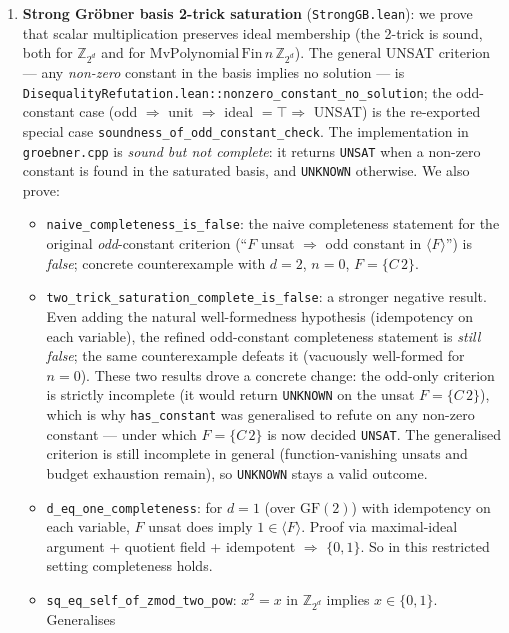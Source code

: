 \documentclass[runningheads]{llncs}
\begin{document}
\begin{enumerate}
\item \textbf{Strong Gr\"obner basis 2-trick saturation}
  (\texttt{StrongGB.lean}): we prove that scalar multiplication
  preserves ideal membership (the 2-trick is sound, both for
  $\mathbb{Z}_{2^d}$ and for $\mathrm{MvPolynomial}\, \mathrm{Fin}\, n\, \mathbb{Z}_{2^d}$).
  The general UNSAT criterion --- any \emph{non-zero} constant in
  the basis implies no solution --- is
  \texttt{DisequalityRefutation.lean::nonzero\_constant\_no\_solution};
  the odd-constant case (odd $\Rightarrow$ unit $\Rightarrow$
  ideal $= \top \Rightarrow$ UNSAT) is the re-exported special
  case \texttt{soundness\_of\_odd\_constant\_check}. The
  implementation in \texttt{groebner.cpp} is \emph{sound but not
  complete}: it returns \texttt{UNSAT} when a non-zero constant
  is found in the saturated basis, and \texttt{UNKNOWN}
  otherwise. We also prove:
  \begin{itemize}
  \item \texttt{naive\_completeness\_is\_false}: the naive
    completeness statement for the original \emph{odd}-constant
    criterion (``$F$ unsat $\Rightarrow$ odd constant
    in $\langle F\rangle$'') is \emph{false}; concrete
    counterexample with $d=2$, $n=0$, $F=\{C\,2\}$.
  \item \texttt{two\_trick\_saturation\_complete\_is\_false}:
    a stronger negative result. Even adding the natural
    well-formedness hypothesis (idempotency on each variable),
    the refined odd-constant completeness statement is
    \emph{still false}; the same counterexample defeats it
    (vacuously well-formed for $n=0$). These two results drove a
    concrete change: the odd-only criterion is strictly
    incomplete (it would return \texttt{UNKNOWN} on the unsat
    $F=\{C\,2\}$), which is why \texttt{has\_constant} was
    generalised to refute on any non-zero constant --- under
    which $F=\{C\,2\}$ is now decided \texttt{UNSAT}. The
    generalised criterion is still incomplete in general
    (function-vanishing unsats and budget exhaustion remain),
    so \texttt{UNKNOWN} stays a valid outcome.
  \item \texttt{d\_eq\_one\_completeness}: for $d=1$ (over
    $\mathrm{GF}(2)$) with idempotency on each variable, $F$
    unsat does imply $1 \in \langle F\rangle$. Proof via
    maximal-ideal argument + quotient field + idempotent
    $\Rightarrow$ $\{0,1\}$. So in this restricted setting
    completeness holds.
  \item \texttt{sq\_eq\_self\_of\_zmod\_two\_pow}: $x^2 = x$ in
    $\mathbb{Z}_{2^d}$ implies $x \in \{0,1\}$. Generalises

\end{itemize}
\end{enumerate}
\end{document}
